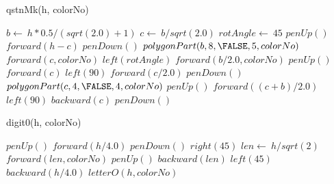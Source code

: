 \documentclass[a4paper,10pt]{article}
\begin{document}
\begin{algorithm}
\caption{qstnMk(h, colorNo)}
\begin{algorithmic}[5]

\STATE {}
\STATE {}
  \STATE \(b\gets\ h*0.5/(sqrt(2.0)+1)\)
  \STATE \(c\gets\ b/sqrt(2.0)\)
  \STATE \(rotAngle\gets\ 45\)
  \STATE \(penUp()\)
  \STATE \(forward(h-c)\)
  \STATE \(penDown()\)
  \STATE {}
  \STATE {}
  \STATE \(polygonPart(b,8,\FALSE,5,colorNo)\)
  \STATE \(forward(c,colorNo)\)
  \STATE \(left(rotAngle)\)
  \STATE \(forward(b/2.0,colorNo)\)
  \STATE \(penUp()\)
  \STATE \(forward(c)\)
  \STATE \(left(90)\)
  \STATE \(forward(c/2.0)\)
  \STATE \(penDown()\)
  \STATE {}
  \STATE {}
  \STATE \(polygonPart(c,4,\FALSE,4,colorNo)\)
  \STATE \(penUp()\)
  \STATE \(forward((c+b)/2.0)\)
  \STATE \(left(90)\)
  \STATE \(backward(c)\)
  \STATE \(penDown()\)

\end{algorithmic}
\end{algorithm}


\begin{algorithm}
\caption{digit0(h, colorNo)}
\begin{algorithmic}[5]

\STATE {}
\STATE {}
  \STATE \(penUp()\)
  \STATE \(forward(h/4.0)\)
  \STATE \(penDown()\)
  \STATE \(right(45)\)
  \STATE \(len\gets\ h/sqrt(2)\)
  \STATE \(forward(len,colorNo)\)
  \STATE \(penUp()\)
  \STATE \(backward(len)\)
  \STATE \(left(45)\)
  \STATE \(backward(h/4.0)\)
  \STATE \(letterO(h,colorNo)\)

\end{algorithmic}
\end{algorithm}
\end{document}
